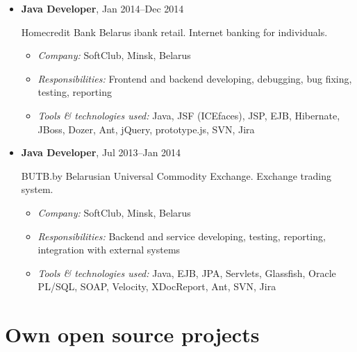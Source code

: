 \documentclass[a4paper, 12pt]{article}
\newcommand{\position}[1]{
    \textbf{#1}}
\newcommand{\itemlabel}[1]{
    \textit{#1:}}
\begin{document}
\begin{itemize}
        \item \position{Java Developer}, Jan 2014--Dec 2014

           Homecredit Bank Belarus ibank retail. Internet banking for individuals. 

            \begin{itemize}
                \item \itemlabel{Company} SoftClub, Minsk, Belarus
                \item \itemlabel{Responsibilities} Frontend and backend developing, debugging, bug fixing, testing, reporting
                \item \itemlabel{Tools \& technologies used} Java, JSF (ICEfaces), JSP, EJB, Hibernate, JBoss, Dozer, Ant, jQuery, prototype.js, SVN, Jira
            \end{itemize}


        \item \position{Java Developer}, Jul 2013--Jan 2014

            BUTB.by Belarusian Universal Commodity Exchange. Exchange trading system.

            \begin{itemize}
                \item \itemlabel{Company} SoftClub, Minsk, Belarus
                \item \itemlabel{Responsibilities} Backend and service developing, testing, reporting, integration with external systems
                \item \itemlabel{Tools \& technologies used} Java, EJB, JPA, Servlets, Glassfish, Oracle PL/SQL, SOAP, Velocity, XDocReport, Ant, SVN, Jira
            \end{itemize}

    \end{itemize}    
    
\section*{Own open source projects}  
\end{document}
